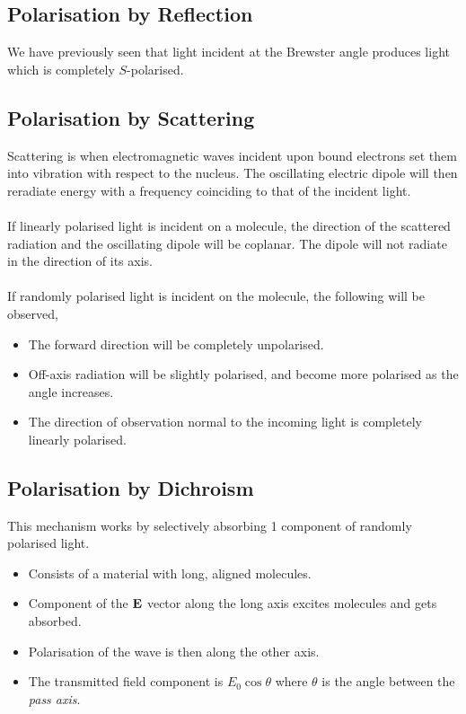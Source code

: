 \documentclass{book}
\begin{document}
{\subsection{Polarisation by Reflection}
We have previously seen that light incident at the Brewster angle produces light which is completely $S$-polarised.
\subsection{Polarisation by Scattering}
Scattering is when electromagnetic waves incident upon bound electrons set them into vibration with respect to the nucleus. The oscillating electric dipole will then reradiate energy with a frequency coinciding to that of the incident light.
\\\\
If linearly polarised light is incident on a molecule, the direction of the scattered radiation and the oscillating dipole will be coplanar. The dipole will not radiate in the direction of its axis.
\\\\
If randomly polarised light is incident on the molecule, the following will be observed,
\begin{itemize}
	\item The forward direction will be completely unpolarised.
	\item Off-axis radiation will be slightly polarised, and become more polarised as the angle increases.
	\item The direction of observation normal to the incoming light is completely linearly polarised. 
\end{itemize}
\subsection{Polarisation by Dichroism}
This mechanism works by selectively absorbing 1 component of randomly polarised light.
\begin{itemize}
	\item Consists of a material with long, aligned molecules.
	\item Component of the $\vb{E}$ vector along the long axis excites molecules and gets absorbed.
	\item Polarisation of the wave is then along the other axis.
	\item The transmitted field component is $E_0\cos\theta$ where $\theta$ is the angle between the \textit{pass axis}.
\end{itemize}
}
\end{document}
